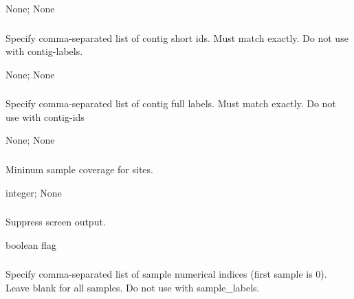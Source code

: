 \documentclass[letterpaper,11pt,english]{sphinxmanual}
\begin{document}
 None;  None


\subsubsection{}
\label{\detokenize{prog_desc:id49}}
 Specify comma-separated list of contig short ids. Must match exactly. Do not use with \textendash{}contig-labels.

 None;  None


\subsubsection{}
\label{\detokenize{prog_desc:contig-labels-contiglabels}}
 Specify comma-separated list of contig full labels. Must match exactly. Do not use with \textendash{}contig-ids

 None;  None


\subsubsection{}
\label{\detokenize{prog_desc:mincoverage}}
 Mininum sample coverage for sites.

 integer;  None


\subsubsection{}
\label{\detokenize{prog_desc:id50}}
 Suppress screen output.

 boolean flag


\subsubsection{}
\label{\detokenize{prog_desc:id51}}
 Specify comma-separated list of sample numerical indices (first sample is 0). Leave blank for all samples. Do not use with \textendash{}sample\_labels.
\end{document}
